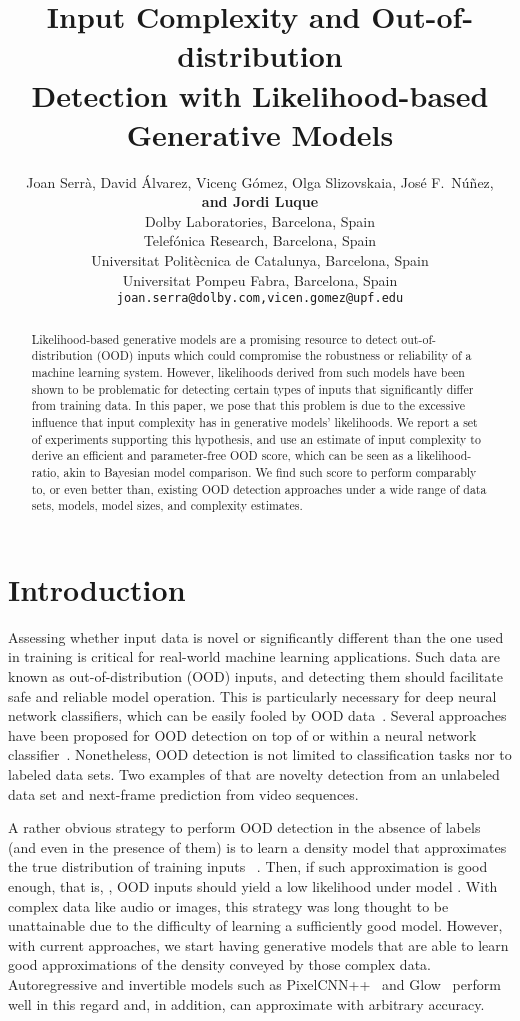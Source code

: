 \documentclass[letterpaper]{article} \usepackage{iclr2020_conference,times}
\title{Input Complexity and Out-of-distribution\\ Detection with Likelihood-based\\ Generative Models}
\author{Joan Serr\`a, David \'Alvarez, Vicen\c{c} G\'omez, Olga Slizovskaia, Jos\'e F.~N\'u\~nez,\\ {\fontsize{9.6}{10}\textbf{and Jordi Luque}} \\
 Dolby Laboratories, Barcelona, Spain \\
 Telef\'onica Research, Barcelona, Spain \\
 Universitat Polit\`ecnica de Catalunya, Barcelona, Spain \\
 Universitat Pompeu Fabra, Barcelona, Spain \\
\texttt{joan.serra@dolby.com,vicen.gomez@upf.edu}
}
\begin{document}
\maketitle

\begin{abstract}
Likelihood-based generative models are a promising resource to detect out-of-distribution (OOD) inputs which could compromise the robustness or reliability of a machine learning system. However, likelihoods derived from such models have been shown to be problematic for detecting certain types of inputs that significantly differ from training data. In this paper, we pose that this problem is due to the excessive influence that input complexity has in generative models' likelihoods. We report a set of experiments supporting this hypothesis, and use an estimate of input complexity to derive an efficient and parameter-free OOD score, which can be seen as a likelihood-ratio, akin to Bayesian model comparison. We find such score to perform comparably to, or even better than, existing OOD detection approaches under a wide range of data sets, models, model sizes, and complexity estimates.
\end{abstract}



\section{Introduction}
\label{sec:intro}

Assessing whether input data is novel or significantly different than the one used in training is critical for real-world machine learning applications. Such data are known as out-of-distribution (OOD) inputs, and detecting them should facilitate safe and reliable model operation. This is particularly necessary for deep neural network classifiers, which can be easily fooled by OOD data~\citep{Nguyen15CVPR}. Several approaches have been proposed for OOD detection on top of or within a neural network classifier~\citep{Hendrycks17ICLR, Laksh17NeurIPS, Liang18ICLR, Lee18NeurIPS}. Nonetheless, OOD detection is not limited to classification tasks nor to labeled data sets. Two examples of that are novelty detection from an unlabeled data set and next-frame prediction from video sequences.

A rather obvious strategy to perform OOD detection in the absence of labels (and even in the presence of them) is to learn a density model  that approximates the true distribution  of training inputs ~\citep{Bishop94IEEEPROC}. Then, if such approximation is good enough, that is, , OOD inputs should yield a low likelihood under model . With complex data like audio or images, this strategy was long thought to be unattainable due to the difficulty of learning a sufficiently good model. However, with current approaches, we start having generative models that are able to learn good approximations of the density conveyed by those complex data. Autoregressive and invertible models such as PixelCNN++~\citep{Salimans17ICLR} and Glow~\citep{Kingma18NEURIPS} perform well in this regard and, in addition, can approximate  with arbitrary accuracy.
\end{document}
